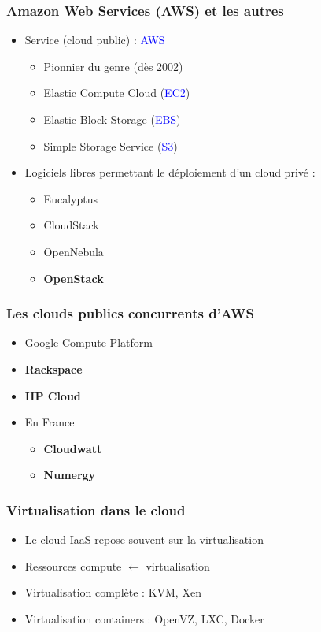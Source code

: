   \begin{frame}
    \frametitle{Amazon Web Services (AWS) et les autres}
    \begin{itemize}
      \item Service (cloud public) : \textcolor{blue}{AWS}
      \begin{itemize}
        \item Pionnier du genre (dès 2002)\pause
        \item Elastic Compute Cloud (\textcolor{blue}{EC2})
        \item Elastic Block Storage (\textcolor{blue}{EBS})\pause
        \item Simple Storage Service (\textcolor{blue}{S3})\pause
      \end{itemize}
        \item Logiciels libres permettant le déploiement d'un cloud privé :
      \begin{itemize}
        \item Eucalyptus
        \item CloudStack
        \item OpenNebula\pause
        \item \textbf{OpenStack}
      \end{itemize}
    \end{itemize}
  \end{frame}

  \begin{frame}
    \frametitle{Les clouds publics concurrents d'AWS}
    \begin{itemize}
      \item Google Compute Platform
      \item \textbf<3->{Rackspace}
      \item \textbf<3->{HP Cloud}\pause
      \item En France
      \begin{itemize}
        \item \textbf<3->{Cloudwatt}
        \item \textbf<3->{Numergy}
      \end{itemize}
    \end{itemize}
  \end{frame}

  \begin{frame}
    \frametitle{Virtualisation dans le cloud}
    \begin{itemize}
      \item Le cloud IaaS repose souvent sur la virtualisation
      \item Ressources compute $\leftarrow$ virtualisation
      \item Virtualisation complète : KVM, Xen
      \item Virtualisation containers : OpenVZ, LXC, Docker
    \end{itemize}
  \end{frame}

